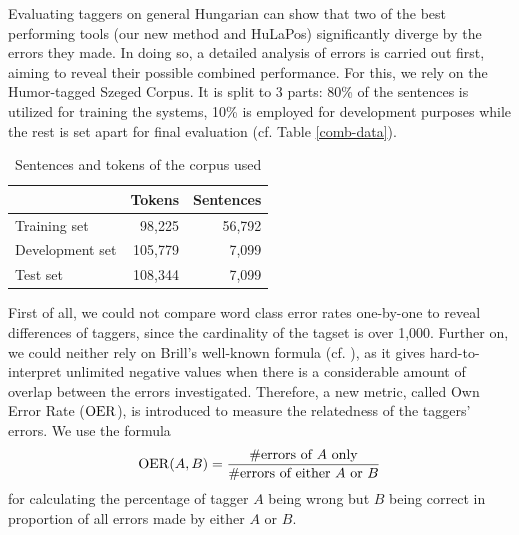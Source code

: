 Evaluating taggers on general Hungarian can show that two of the best performing tools (our new method and HuLaPos) significantly diverge by the errors they made.
In doing so, a detailed analysis of errors is carried out first, aiming to reveal their possible combined performance.
For this, we rely on the Humor-tagged Szeged Corpus.
It is split to 3 parts: 80\% of the sentences is utilized for training the systems, 10\% is employed for development purposes while the rest is set apart for final evaluation (cf. Table \ref{comb-data}).

\begin{table}[H]
\centering
\caption{Sentences and tokens of the corpus used}\label{tab:comb-data}
\begin{tabular}{l r r}
\hline
& Tokens & Sentences \\
\hline
Training set & 98,225 & 56,792\\
Development set & 105,779 & 7,099 \\
Test set & 108,344 & 7,099 \\
\hline
\end{tabular}
\end{table}

First of all, we could not compare word class error rates one-by-one to reveal differences of taggers, since the cardinality of the tagset is over 1,000.
Further on, we could neither rely on Brill's well-known formula (cf. \cite{Brill1998}), as it gives hard-to-interpret unlimited negative values when there is a considerable amount of overlap between the errors investigated.
Therefore, a new metric, called Own Error Rate ($\operatorname{OER}$), is introduced to measure the relatedness of the taggers' errors.
We use the formula 
\begin{equation}
\operatorname{OER}(A,B)=\frac{\text{\#errors of }A\text{ only}}{\text{\#errors of either }A\text{ or }B}
\end{equation}
for calculating the percentage of tagger $A$ being wrong but $B$ being correct in proportion of all errors made by either $A$ or $B$.

